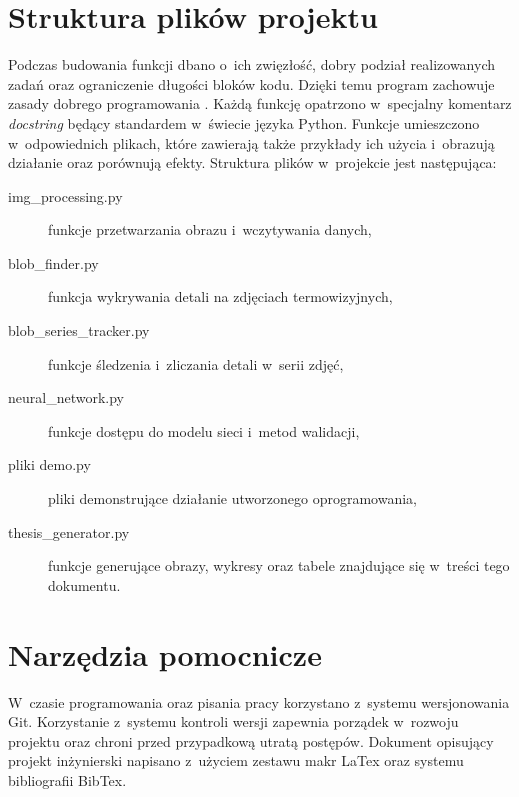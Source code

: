 \section{Struktura plików projektu}
Podczas budowania funkcji dbano o~ich zwięzłość, dobry podział realizowanych
zadań oraz ograniczenie długości bloków kodu.
Dzięki temu program zachowuje zasady dobrego programowania \cite{martin_code}.
Każdą funkcję opatrzono w~specjalny komentarz \emph{docstring} będący
standardem w~świecie języka Python.
Funkcje umieszczono w~odpowiednich plikach, które zawierają także
przykłady ich użycia i~obrazują działanie oraz porównują efekty.
Struktura plików w~projekcie jest następująca:
\begin{description}
    \item[img\_processing.py]
          funkcje przetwarzania obrazu i~wczytywania danych,
    \item[blob\_finder.py]
          funkcja wykrywania detali na zdjęciach termowizyjnych,
    \item[blob\_series\_tracker.py]
          funkcje śledzenia i~zliczania detali w~serii zdjęć,
    \item[neural\_network.py]
          funkcje dostępu do modelu sieci i~metod walidacji,
    \item[pliki demo.py]
          pliki demonstrujące działanie utworzonego oprogramowania,
    \item[thesis\_generator.py]
          funkcje generujące obrazy, wykresy oraz tabele znajdujące się
          w~treści tego dokumentu.
\end{description}

\section{Narzędzia pomocnicze}
W~czasie programowania oraz pisania pracy korzystano z~systemu wersjonowania
Git.
Korzystanie z~systemu kontroli wersji zapewnia porządek w~rozwoju projektu
oraz chroni przed przypadkową utratą postępów.
Dokument opisujący projekt inżynierski napisano z~użyciem zestawu makr
LaTex oraz systemu bibliografii BibTex.

